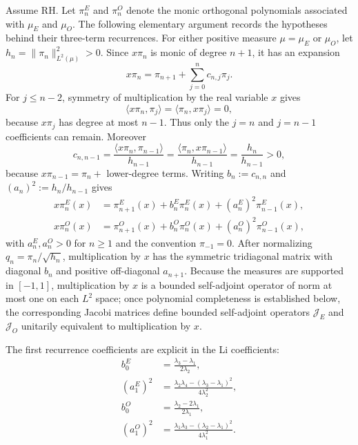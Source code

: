 \documentclass[11pt]{amsart}
\numberwithin{equation}{section}
\theoremstyle{plain}
\theoremstyle{definition}
\theoremstyle{remark}
\newcommand{\RH}{\mathrm{RH}}
\begin{document}
Assume $\RH$. Let $\pi_n^E$ and $\pi_n^O$ denote the monic orthogonal polynomials associated with $\mu_E$ and $\mu_O$.  The following elementary argument records the hypotheses behind their three-term recurrences.  For either positive measure $\mu=\mu_E$ or $\mu_O$, let $h_n=\|\pi_n\|_{L^2(\mu)}^2>0$.  Since $x\pi_n$ is monic of degree $n+1$, it has an expansion
\begin{equation}
x\pi_n=\pi_{n+1}+\sum_{j=0}^{n}c_{n,j}\pi_j.
\end{equation}
For $j\le n-2$, symmetry of multiplication by the real variable $x$ gives
\begin{equation}
\langle x\pi_n,\pi_j\rangle
=\langle\pi_n,x\pi_j\rangle=0,
\end{equation}
because $x\pi_j$ has degree at most $n-1$.  Thus only the $j=n$ and $j=n-1$ coefficients can remain.  Moreover
\begin{equation}
c_{n,n-1}
=\frac{\langle x\pi_n,\pi_{n-1}\rangle}{h_{n-1}}
=\frac{\langle\pi_n,x\pi_{n-1}\rangle}{h_{n-1}}
=\frac{h_n}{h_{n-1}}>0,
\end{equation}
because $x\pi_{n-1}=\pi_n+$ lower-degree terms.  Writing
$b_n:=c_{n,n}$ and $(a_n)^2:=h_n/h_{n-1}$ gives
\begin{align}
x\pi_n^E(x)
&=\pi_{n+1}^E(x)+b_n^E\pi_n^E(x)+(a_n^E)^2\pi_{n-1}^E(x),
\label{eq:E_monic_recurrence}\\
x\pi_n^O(x)
&=\pi_{n+1}^O(x)+b_n^O\pi_n^O(x)+(a_n^O)^2\pi_{n-1}^O(x),
\label{eq:O_monic_recurrence}
\end{align}
with $a_n^E,a_n^O>0$ for $n\ge1$ and the convention $\pi_{-1}=0$.  After normalizing $q_n=\pi_n/\sqrt{h_n}$, multiplication by $x$ has the symmetric tridiagonal matrix with diagonal $b_n$ and positive off-diagonal $a_{n+1}$.  Because the measures are supported in $[-1,1]$, multiplication by $x$ is a bounded self-adjoint operator of norm at most one on each $L^2$ space; once polynomial completeness is established below, the corresponding Jacobi matrices define bounded self-adjoint operators $\mathcal J_E$ and $\mathcal J_O$ unitarily equivalent to multiplication by $x$.

The first recurrence coefficients are explicit in the Li coefficients:
\begin{align}
b_0^E
&=\frac{\lambda_3-\lambda_1}{2\lambda_2},
\label{eq:b0E}\\
(a_1^E)^2
&=\frac{\lambda_2\lambda_4-(\lambda_3-\lambda_1)^2}{4\lambda_2^2},
\label{eq:a1E}\\
b_0^O
&=\frac{\lambda_2-2\lambda_1}{2\lambda_1},
\label{eq:b0O}\\
(a_1^O)^2
&=\frac{\lambda_1\lambda_3-(\lambda_2-\lambda_1)^2}{4\lambda_1^2}.
\label{eq:a1O}
\end{align}
\end{document}
